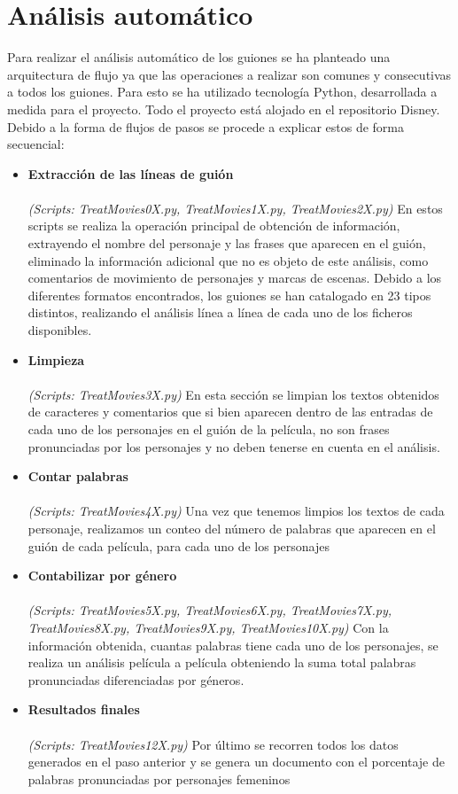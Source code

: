 \section{Análisis automático}
Para realizar el análisis automático de los guiones se ha planteado una arquitectura de flujo ya que las operaciones a realizar son comunes y consecutivas a todos los guiones. Para esto se ha utilizado tecnología Python, desarrollada a medida para el proyecto. Todo el proyecto está alojado en el repositorio Disney.
Debido a la forma de flujos de pasos se procede a explicar estos de forma secuencial:
\begin{itemize}
    \item \textbf{Extracción de las líneas de guión} \\\\
        \textit{(Scripts: TreatMovies0X.py, TreatMovies1X.py, TreatMovies2X.py)} En estos scripts se realiza la operación principal de obtención de información, extrayendo el nombre del personaje y las frases que aparecen en el guión, eliminado la información adicional que no es objeto de este análisis, como comentarios de movimiento de personajes y marcas de escenas. Debido a los diferentes formatos encontrados, los guiones se han catalogado en 23 tipos distintos, realizando el análisis línea a línea de cada uno de los ficheros disponibles.
    \item \textbf{Limpieza} \\\\
        \textit{(Scripts: TreatMovies3X.py)} En esta sección se limpian los textos obtenidos de caracteres y comentarios que si bien aparecen dentro de las entradas de cada uno de los personajes en el guión de la película, no son frases pronunciadas por los personajes y no deben tenerse en cuenta en el análisis.
    \item \textbf{Contar palabras}\\\\
        \textit{(Scripts: TreatMovies4X.py)} Una vez que tenemos limpios los textos de cada personaje, realizamos un conteo del número de palabras que aparecen en el guión de cada película, para cada uno de los personajes
    \item \textbf{Contabilizar por género}\\\\
        \textit{(Scripts: TreatMovies5X.py, TreatMovies6X.py, TreatMovies7X.py, TreatMovies8X.py, TreatMovies9X.py, TreatMovies10X.py)} Con la información obtenida, cuantas palabras tiene cada uno de los personajes, se realiza un análisis película a película obteniendo la suma total palabras pronunciadas diferenciadas por géneros.
    \item \textbf{Resultados finales}\\\\
        \textit{(Scripts: TreatMovies12X.py)} Por último se recorren todos los datos generados en el paso anterior y se genera un documento con el porcentaje de palabras pronunciadas por personajes femeninos
\end{itemize}